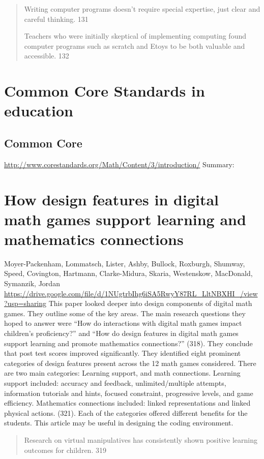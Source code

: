 \documentclass[12pt]{extarticle}
\begin{document}
{\begin{quotation}
    Writing computer programs doesn’t require special expertise, just clear and careful thinking. 131
    
    Teachers who were initially skeptical of implementing computing found computer programs such as scratch and Etoys to be both valuable and accessible. 132
\end{quotation}


\section*{Common Core Standards in education}
\subsection*{Common Core}
\url{http://www.corestandards.org/Math/Content/3/introduction/}
Summary:	

\section*{How design features in digital math games support learning and mathematics connections}
Moyer-Packenham, Lommatsch, Lister, Ashby, Bullock, Roxburgh, Shumway, Speed, Covington, Hartmann, Clarke-Midura, Skaria, Westenskow, MacDonald, Symanzik, Jordan
\url{https://drive.google.com/file/d/1NUgtrbIhg6iSA5RwyY87RL_LltNBXHI_/view?usp=sharing}  
This paper looked deeper into design components of digital math games. They outline some of the key areas. The main research questions they hoped to answer were “How do interactions with digital math games impact children’s proficiency?” and “How do design features in digital math games support learning and promote mathematics connections?” (318). They conclude that post test scores improved significantly. They identified eight prominent categories of design features present across the 12 math games considered. There are two main categories: Learning support, and math connections. Learning support included: accuracy and feedback, unlimited/multiple attempts, information tutorials and hints, focused constraint, progressive levels, and game efficiency. Mathematics connections included: linked representations and linked physical actions. (321). Each of the categories offered different benefits for the students. This article may be useful in designing the coding environment. 
\begin{quote}
    
    Research on virtual manipulatives has consistently shown positive learning outcomes for children. 319	
    

\end{quote}}
\end{document}
